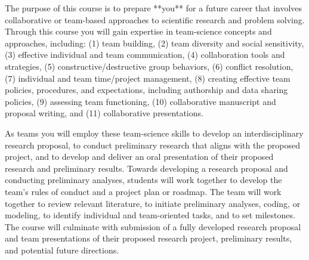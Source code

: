 \usepackage{booktabs}
\usepackage{amsthm}
\makeatletter
\def\thm@space@setup{%
  \thm@preskip=8pt plus 2pt minus 4pt
  \thm@postskip=\thm@preskip
}
\makeatother


The purpose of this course is to prepare **you** for a future career that involves collaborative or team-based approaches to scientific research and problem solving. Through this course you will gain expertise in team-science concepts and approaches, including:
  (1) team building,
  (2) team diversity and social sensitivity,
  (3) effective individual and team communication,
  (4) collaboration tools and strategies,
  (5) constructive/destructive group behaviors,
  (6) conflict resolution,
  (7) individual and team time/project management,
  (8) creating effective team policies, procedures, and expectations, including authorship and data sharing policies,
  (9) assessing team functioning,
  (10) collaborative manuscript and proposal writing, and
  (11) collaborative presentations.

  As teams you will employ these team-science skills to develop an interdisciplinary research proposal, to conduct preliminary research that aligns with the proposed project, and to develop and deliver an oral presentation of their proposed research and preliminary results. Towards developing a research proposal and conducting preliminary analyses, students will work together to develop the team’s rules of conduct and a project plan or roadmap. The team will work together to review relevant literature, to initiate preliminary analyses, coding, or modeling, to identify individual and team-oriented tasks, and to set milestones. The course will culminate with submission of a fully developed research proposal and team presentations of their proposed research project, preliminary results, and potential future directions.
